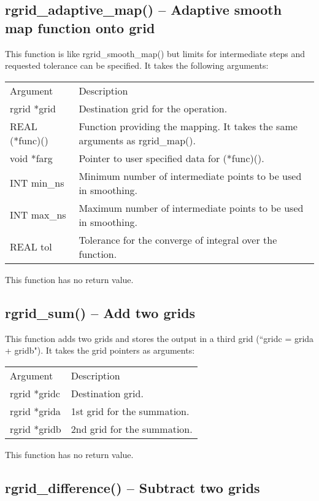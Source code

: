 \documentclass[12pt,letterpaper]{report}
\begin{document}
\subsection{rgrid\_adaptive\_map() -- Adaptive smooth map function onto grid}

This function is like rgrid\_smooth\_map() but limits for intermediate steps and requested tolerance can be specified. It takes the following arguments:
\begin{longtable}{p{} p{}}
Argument & Description\\
\cline{1-2}
rgrid *grid & Destination grid for the operation.\\
REAL (*func)() & Function providing the mapping. It takes the same arguments as rgrid\_map().\\
void *farg & Pointer to user specified data for (*func)().\\
INT min\_ns & Minimum number of intermediate points to be used in smoothing.\\
INT max\_ns & Maximum number of intermediate points to be used in smoothing.\\
REAL tol & Tolerance for the converge of integral over the function.\\
\end{longtable}
\noindent
This function has no return value.

\subsection{rgrid\_sum() -- Add two grids}

This function adds two grids and stores the output in a third grid (``gridc = grida + gridb"). It takes the grid pointers as arguments:
\begin{longtable}{p{} p{}}
Argument & Description\\
\cline{1-2}
rgrid *gridc & Destination grid.\\
rgrid *grida & 1st grid for the summation.\\
rgrid *gridb & 2nd grid for the summation.\\
\end{longtable}
\noindent
This function has no return value.

\subsection{rgrid\_difference() -- Subtract two grids}
\end{document}
